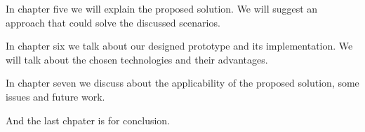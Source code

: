 In chapter five we will explain the proposed solution. 
We will suggest an approach that could solve the discussed scenarios.

In chapter six we talk about our designed prototype and its implementation.
We will talk about the chosen technologies and their advantages.

In chapter seven we discuss about the applicability of the proposed solution, some issues and future work.

And the last chpater is for conclusion.







